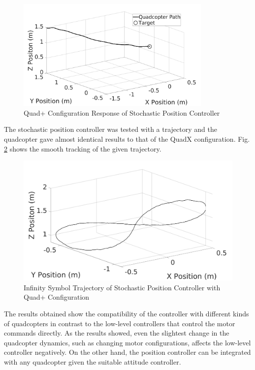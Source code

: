     \begin{figure}[H]
            \centering
            \includegraphics[width=0.85\textwidth]{plots/p_sac.jpg}
            \caption{Quad+ Configuration Response of Stochastic Position Controller}
            \label{stabp}
    \end{figure}
    The stochastic position controller was tested with a trajectory and the quadcopter gave almost identical results to that of the QuadX configuration. Fig. \ref{traj2p} shows the smooth tracking of the given trajectory.
    \begin{figure}[H]
            \centering
            \includegraphics[width=1\textwidth]{plots/traj2P.jpg}
            \caption{Infinity Symbol Trajectory of Stochastic Position Controller with Quad+ Configuration}
            \label{traj2p}
    \end{figure}
    The results obtained show the compatibility of the controller with different kinds of quadcopters in contrast to the low-level controllers that control the motor commands directly. As the results showed, even the slightest change in the quadcopter dynamics, such as changing motor configurations, affects the low-level controller negatively. On the other hand, the position controller can be integrated with any quadcopter given the suitable attitude controller.
